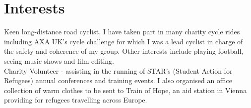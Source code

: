 \documentclass[11pt]{article}
\begin{document}
\section*{Interests}

Keen long-distance road cyclist. I have taken part in many charity cycle rides including AXA UK's cycle challenge for which I was a lead cyclist in charge of the safety and coherence of my group. Other interests include playing football, seeing music shows and film editing.\\

\noindent Charity Volunteer - assisting in the running of STAR's (Student Action for Refugees) annual conferences and training events.
I also organised an office collection of warm clothes to be sent to Train of Hope, an aid station in Vienna providing for refugees travelling across Europe.

\end{document}
